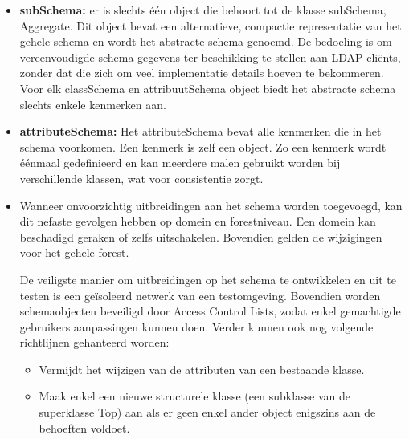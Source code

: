 \begin{enumerate}
		{ 
			\begin{itemize}
				\item \textbf{subSchema:} er is slechts één object die behoort tot de klasse subSchema, Aggregate. Dit object bevat een alternatieve, compactie representatie van het gehele schema en wordt het abstracte schema genoemd. De bedoeling is om vereenvoudigde schema gegevens ter beschikking te stellen aan LDAP cliënts, zonder dat die zich om veel implementatie details hoeven te bekommeren. Voor elk classSchema en attribuutSchema object biedt het abstracte schema slechts enkele kenmerken aan. 
				\item \textbf{attributeSchema:} Het attributeSchema bevat alle kenmerken die in het schema voorkomen. Een kenmerk is zelf een object. Zo een kenmerk wordt éénmaal gedefinieerd en kan meerdere malen gebruikt worden bij verschillende klassen, wat voor consistentie zorgt.
			\end{itemize}
		}
		
		 { 
			\begin{itemize}
				\item Wanneer onvoorzichtig uitbreidingen aan het schema worden toegevoegd, kan dit nefaste gevolgen hebben op domein en forestniveau. Een domein kan beschadigd geraken of zelfs uitschakelen. Bovendien gelden de wijzigingen voor het gehele forest.
				
				De veiligste manier om uitbreidingen op het schema te ontwikkelen en uit te testen is een geïsoleerd netwerk van een testomgeving. Bovendien worden schemaobjecten beveiligd door Access Control Lists, zodat enkel gemachtigde gebruikers aanpassingen kunnen doen. Verder kunnen ook nog volgende richtlijnen gehanteerd worden:
				\begin{itemize}
					\item Vermijdt het wijzigen van de attributen van een bestaande klasse.
					\item Maak enkel een nieuwe structurele klasse (een subklasse van de superklasse Top) aan als er geen enkel ander object enigszins aan de behoeften voldoet.
				\end{itemize}
				

\end{itemize}}
\end{enumerate}

